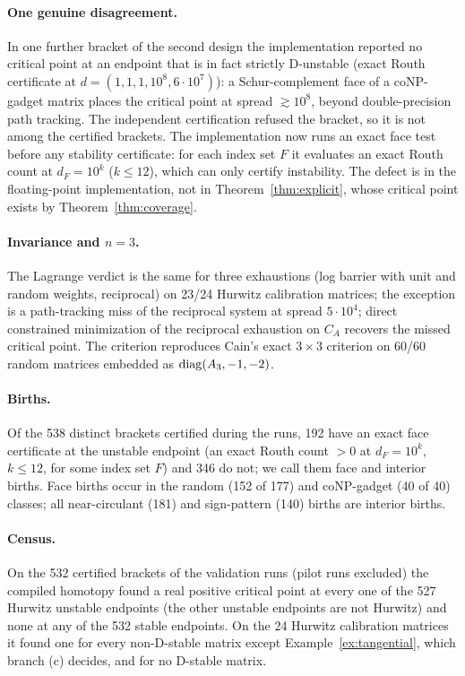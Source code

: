 \paragraph{One genuine disagreement.} In one further bracket of the second design the implementation reported no critical point at an endpoint that is in fact strictly D-unstable (exact Routh certificate at $d=(1,1,1,10^8,6\cdot10^7)$): a Schur-complement face of a coNP-gadget matrix places the critical point at spread $\gtrsim10^8$, beyond double-precision path tracking. The independent certification refused the bracket, so it is not among the certified brackets. The implementation now runs an exact face test before any stability certificate: for each index set $F$ it evaluates an exact Routh count at $d_F=10^k$ ($k\le12$), which can only certify instability. The defect is in the floating-point implementation, not in Theorem~\ref{thm:explicit}, whose critical point exists by Theorem~\ref{thm:coverage}.

\paragraph{Invariance and $n=3$.} The Lagrange verdict is the same for three exhaustions (log barrier with unit and random weights, reciprocal) on 23/24 Hurwitz calibration matrices; the exception is a path-tracking miss of the reciprocal system at spread $5\cdot10^4$; direct constrained minimization of the reciprocal exhaustion on $C_A$ recovers the missed critical point. The criterion reproduces Cain's exact $3\times3$ criterion on 60/60 random matrices embedded as $\operatorname{diag}(A_3,-1,-2)$.

\paragraph{Births.} Of the 538 distinct brackets certified during the runs, 192 have an exact face certificate at the unstable endpoint (an exact Routh count $>0$ at $d_F=10^k$, $k\le12$, for some index set $F$) and 346 do not; we call them face and interior births. Face births occur in the random (152 of 177) and coNP-gadget (40 of 40) classes; all near-circulant (181) and sign-pattern (140) births are interior births.

\paragraph{Census.} On the 532 certified brackets of the validation runs (pilot runs excluded) the compiled homotopy found a real positive critical point at every one of the 527 Hurwitz unstable endpoints (the other unstable endpoints are not Hurwitz) and none at any of the 532 stable endpoints. On the 24 Hurwitz calibration matrices it found one for every non-D-stable matrix except Example~\ref{ex:tangential}, which branch (c) decides, and for no D-stable matrix.
